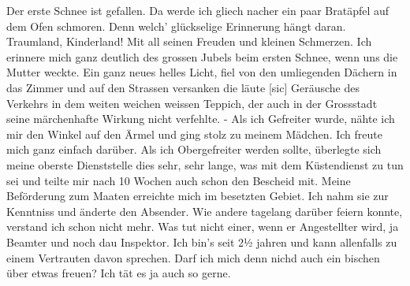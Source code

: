 \def\day{17. Oktober 1943}
\mktitle

Der erste Schnee ist gefallen.
Da werde ich gliech nacher ein paar Brat\"{a}pfel auf dem Ofen schmoren.
Denn welch' gl\"{u}ckselige Erinnerung h\"{a}ngt daran.
Traumland, Kinderland!
Mit all seinen Freuden und kleinen Schmerzen.
Ich erinnere mich ganz deutlich des grossen Jubels beim ersten Schnee, wenn uns die Mutter weckte.
Ein ganz neues helles Licht, fiel von den umliegenden D\"{a}chern in das Zimmer und auf den Strassen versanken die l\"{a}ute{\color{red} [sic] } Ger\"{a}usche des Verkehrs in dem weiten weichen weissen Teppich, der auch in der Grossstadt seine m\"{a}rchenhafte Wirkung nicht verfehlte.
- Als ich Gefreiter wurde, n\"{a}hte ich mir den Winkel auf den \"{A}rmel und ging stolz zu meinem M\"{a}dchen.
Ich freute mich ganz einfach dar\"{u}ber.
Als ich Obergefreiter werden sollte, \"{u}berlegte sich meine oberste Dienststelle dies sehr, sehr lange, was mit dem K\"{u}stendienst zu tun sei und teilte mir nach 10 Wochen auch schon den Bescheid mit.
Meine Bef\"{o}rderung zum Maaten erreichte mich im besetzten Gebiet.
Ich nahm sie zur Kenntniss und \"{a}nderte den Absender.
Wie andere tagelang dar\"{u}ber feiern konnte, verstand ich schon nicht mehr.
Was tut nicht einer, wenn er Angestellter wird, ja Beamter und noch dau Inspektor.
Ich bin's seit 2½ jahren und kann allenfalls zu einem Vertrauten davon sprechen.
Darf ich mich denn nichd auch ein bischen \"{u}ber etwas freuen?
Ich t\"{a}t es ja auch so gerne.

\clearpage

